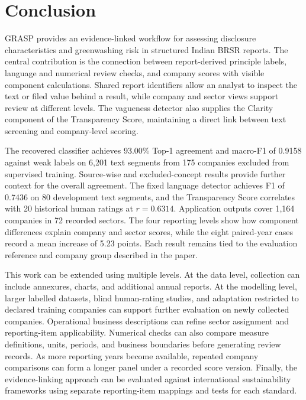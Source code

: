 \clearpage
\section{Conclusion}
\label{sec:conclusion}

GRASP provides an evidence-linked workflow for assessing disclosure characteristics and greenwashing risk in structured Indian BRSR reports. The central contribution is the connection between report-derived principle labels, language and numerical review checks, and company scores with visible component calculations. Shared report identifiers allow an analyst to inspect the text or filed value behind a result, while company and sector views support review at different levels. The vagueness detector also supplies the Clarity component of the Transparency Score, maintaining a direct link between text screening and company-level scoring.

The recovered classifier achieves 93.00\% Top-1 agreement and macro-F1 of 0.9158 against weak labels on 6,201 text segments from 175 companies excluded from supervised training. Source-wise and excluded-concept results provide further context for the overall agreement. The fixed language detector achieves F1 of 0.7436 on 80 development text segments, and the Transparency Score correlates with 20 historical human ratings at $r=0.6314$. Application outputs cover 1,164 companies in 72 recorded sectors. The four reporting levels show how component differences explain company and sector scores, while the eight paired-year cases record a mean increase of 5.23 points. Each result remains tied to the evaluation reference and company group described in the paper.

This work can be extended using multiple levels. At the data level, collection can include annexures, charts, and additional annual reports. At the modelling level, larger labelled datasets, blind human-rating studies, and adaptation restricted to declared training companies can support further evaluation on newly collected companies. Operational business descriptions can refine sector assignment and reporting-item applicability. Numerical checks can also compare measure definitions, units, periods, and business boundaries before generating review records. As more reporting years become available, repeated company comparisons can form a longer panel under a recorded score version. Finally, the evidence-linking approach can be evaluated against international sustainability frameworks using separate reporting-item mappings and tests for each standard.
